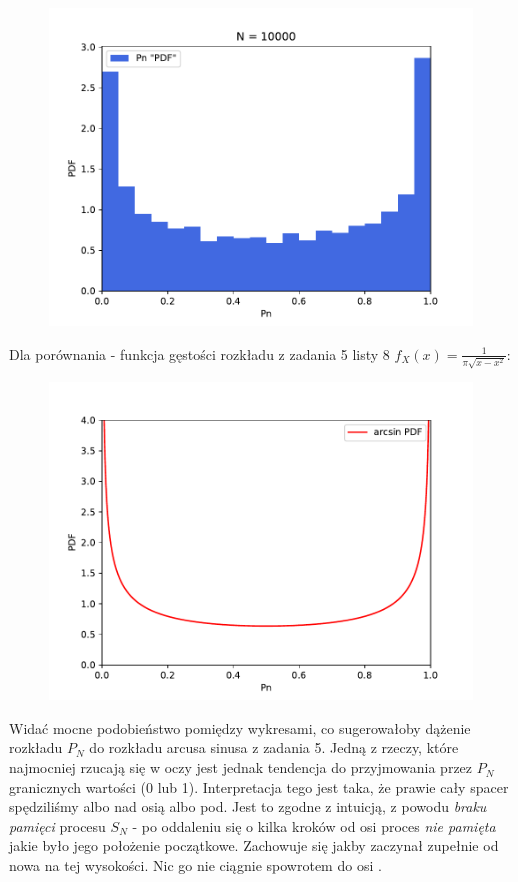 \documentclass{article}
\begin{document}
\begin{figure}[h!]
\begin{minipage}{0.45\textwidth}
    \end{minipage}
    \begin{minipage}{0.45\textwidth}  %
        \centering
        \includegraphics[scale=0.5]{./plots/exc3/n10000.pdf}
    \end{minipage}
\end{figure}

Dla porównania - funkcja gęstości rozkładu z zadania 5 listy 8 \( f_X\left(x\right) = \frac{1}{\pi\sqrt{x - x^2}} \):\\
\begin{figure}[h!]
    \centering
    \includegraphics[scale=0.8]{./plots/exc3/arcsin.pdf}
\end{figure}

Widać mocne podobieństwo pomiędzy wykresami, co sugerowałoby dążenie rozkładu \( P_N \) do rozkładu arcusa sinusa z zadania 5.
Jedną z rzeczy, które najmocniej rzucają się w oczy jest jednak tendencja do przyjmowania przez \( P_N \) granicznych wartości (0 lub 1).
Interpretacja tego jest taka, że prawie cały spacer spędziliśmy albo nad osią  albo pod.
Jest to zgodne z intuicją, z powodu \textit{braku pamięci} procesu \( S_N \) - po oddaleniu się o kilka kroków od osi  
proces \textit{nie pamięta} jakie było jego położenie początkowe. Zachowuje się jakby zaczynał zupełnie od nowa na tej wysokości.
Nic go nie ciągnie spowrotem do osi .
\end{document}
